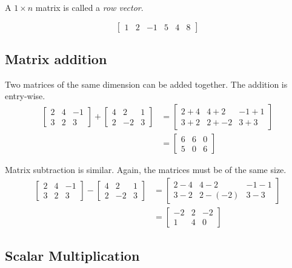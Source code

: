 \documentclass[
]{book}
\theoremstyle{definition}
\theoremstyle{definition}
\theoremstyle{definition}
\theoremstyle{definition}
\theoremstyle{remark}
\begin{document}
A \(1\times n\) matrix is called a \emph{row vector}.

\[\begin{bmatrix}
1 & 2 & -1 & 5 & 4 & 8
\end{bmatrix}\]

\subsection*{Matrix addition}\label{matrix-addition}

Two matrices of the same dimension can be added together. The addition is entry-wise.
\begin{align*}
\begin{bmatrix}
2 & 4 & -1\\
3 & 2 & 3
\end{bmatrix}+
\begin{bmatrix}
4 & 2 & 1\\
2 & -2 & 3
\end{bmatrix}&=
\begin{bmatrix}
2+4 & 4+2 & -1+1\\
3+2 & 2+-2 & 3+3
\end{bmatrix}\\
&=
\begin{bmatrix}
6 & 6 & 0\\
5 & 0 & 6
\end{bmatrix}
\end{align*}

Matrix subtraction is similar. Again, the matrices must be of the same size.
\begin{align*}
\begin{bmatrix}
2 & 4 & -1\\
3 & 2 & 3
\end{bmatrix}-
\begin{bmatrix}
4 & 2 & 1\\
2 & -2 & 3
\end{bmatrix}&=
\begin{bmatrix}
2-4 & 4-2 & -1-1\\
3-2 & 2-(-2) & 3-3
\end{bmatrix}\\
&=
\begin{bmatrix}
-2 & 2 & -2\\
1 & 4 & 0
\end{bmatrix}
\end{align*}

\subsection*{Scalar Multiplication}\label{scalar-multiplication}
\end{document}
